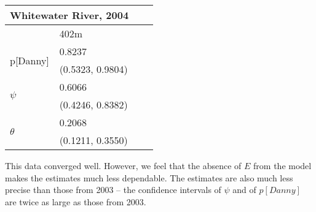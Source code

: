 \documentclass{article}
\begin{document}
    \begin{center}
    \begin{tabular}{|l|l|l|l|}
        \hline
        \multicolumn{2}{|l|}{\textbf{Whitewater River, 2004}} \\
        \hline
            & 402m \\
        \hline
        \multirow{2}{*}{p[Danny]}
            & 0.8237 \\
            & (0.5323, 0.9804) \\
        \hline
        \multirow{2}{*}{\(\psi\)}
            & 0.6066 \\
            & (0.4246, 0.8382) \\
        \hline
        \multirow{2}{*}{\(\theta\)}
            & 0.2068 \\
            & (0.1211, 0.3550) \\
        \hline
    \end{tabular}
    \end{center}

    This data converged well.  However, we feel that the absence of \(E\) from
    the model makes the estimates much less dependable.  The estimates are also
    much less precise than those from 2003 -- the confidence intervals of
    \(\psi\) and of \(p[Danny]\) are twice as large as those from 2003.
\end{document}
